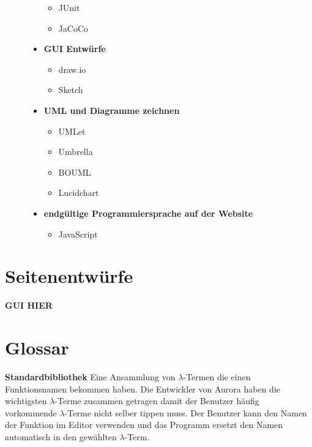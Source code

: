 \documentclass[parskip=full,11pt,twoside]{scrartcl}
\begin{document}
\begin{description}
\begin{itemize}
\begin{itemize}
			\item JUnit
			\item JaCoCo
		\end{itemize}
		\item \textbf{GUI Entwürfe}
			\begin{itemize}
				\item draw.io
				\item Sketch
			\end{itemize}
		\item \textbf{UML und Diagramme zeichnen}
			\begin{itemize}
				\item UMLet
				\item Umbrella
				\item BOUML
				\item Lucidchart
			\end{itemize}
		\item \textbf{endgültige Programmiersprache auf der Website}
			\begin{itemize}
				\item JavaScript
			\end{itemize}
	\end{itemize}
\newpage
\appendix
\end{description}
\section{Seitenentwürfe}
\textbf{GUI HIER}


\newpage
\section{Glossar}

\textbf{Standardbibliothek}
\newline
Eine Ansammlung von $\lambda$-Termen die einen Funktionsnamen bekommen haben. Die Entwickler von Aurora haben die wichtigsten $\lambda$-Terme zusammen getragen damit der Benutzer häufig vorkommende $\lambda$-Terme nicht selber tippen muss. Der Benutzer kann den Namen der Funktion im Editor verwenden und das Programm ersetzt den Namen automatisch in den gewählten $\lambda$-Term.
\end{document}
